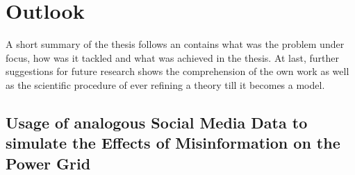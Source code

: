 \chapter{Outlook}
A short summary of the thesis follows an contains what was the problem under focus, how was it tackled and what was achieved in the thesis. At last, further suggestions for future research shows the comprehension of the own work as well as the scientific procedure of ever refining a theory till it becomes a model.


\section{Usage of analogous Social Media Data to simulate the Effects of 
Misinformation on the Power Grid}